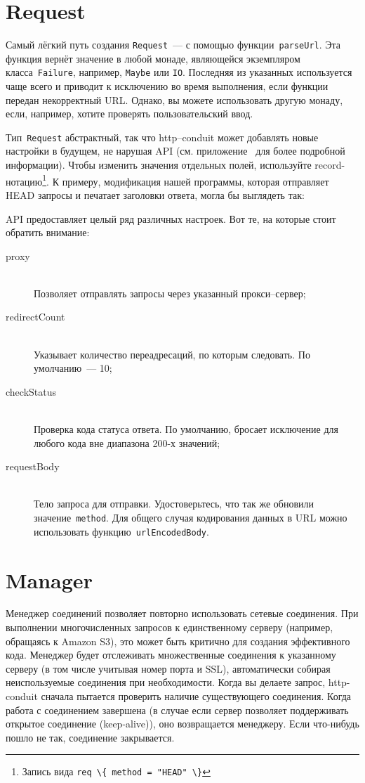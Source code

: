 \section{Request}
Самый лёгкий путь создания \lstinline!Request!~--- с помощью
функции~\lstinline!parseUrl!. Эта функция вернёт значение в любой
монаде, являющейся экземпляром класса~\lstinline!Failure!, например,
\lstinline!Maybe! или \lstinline!IO!. Последняя из указанных
используется чаще всего и приводит к исключению во время выполнения,
если функции передан некорректный URL. Однако, вы можете использовать
другую монаду, если, например, хотите проверять пользовательский ввод.


Тип~\lstinline!Request! абстрактный, так что http--conduit может
добавлять новые настройки в будущем, не нарушая API
(см. приложение~ для более подробной
информации). Чтобы изменить значения отдельных полей, используйте
record-нотацию\footnote{Запись вида \lstinline'req \{ method = "HEAD" \}'}. К примеру, модификация
нашей программы, которая отправляет HEAD запросы и печатает заголовки
ответа, могла бы выглядеть так:


API предоставляет целый ряд различных настроек. Вот те, на которые стоит
обратить внимание:
\begin{description}
\item[proxy] \hfill \\
  Позволяет отправлять запросы через указанный прокси--сервер;
\item[redirectCount] \hfill \\
  Указывает количество переадресаций, по которым следовать. По
  умолчанию~--- 10;
\item[checkStatus] \hfill \\
  Проверка кода статуса ответа. По умолчанию, бросает исключение
  для любого кода вне диапазона 200-х значений;
\item[requestBody] \hfill \\
  Тело запроса для отправки. Удостоверьтесь, что так же обновили значение~\lstinline!method!.
  Для общего случая кодирования данных в URL можно использовать
  функцию~\lstinline!urlEncodedBody!.
\end{description}

\section{Manager}
Менеджер соединений позволяет повторно использовать
сетевые соединения. При выполнении многочисленных запросов к единственному
серверу (например, обращаясь к Amazon S3), это может быть критично для
создания эффективного кода. Менеджер будет отслеживать множественные
соединения к указанному серверу (в том числе учитывая номер порта и
SSL), автоматически собирая неиспользуемые
соединения при необходимости. Когда вы делаете запрос, http-conduit
сначала пытается проверить наличие существующего соединения. Когда
работа с соединением завершена (в случае если сервер позволяет поддерживать открытое
соединение (keep-alive)), оно возвращается менеджеру. Если
что-нибудь пошло не так, соединение закрывается.

